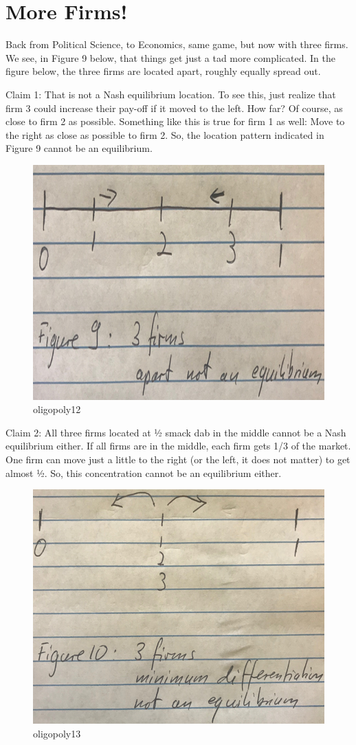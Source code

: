 \documentclass[
]{book}
\begin{document}
\hypertarget{more-firms}{%
\section{More Firms!}\label{more-firms}}

Back from Political Science, to Economics, same game, but now with three firms. We see, in Figure 9 below, that things get just a tad more complicated. In the figure below, the three firms are located apart, roughly equally spread out.

Claim 1: That is not a Nash equilibrium location. To see this, just realize that firm 3 could increase their pay-off if it moved to the left. How far? Of course, as close to firm 2 as possible. Something like this is true for firm 1 as well: Move to the right as close as possible to firm 2. So, the location pattern indicated in Figure 9 cannot be an equilibrium.

\begin{figure}

{\centering \includegraphics[width=0.5\linewidth]{img/oligopoly/fig12} 

}

\caption{oligopoly12}\label{fig:oligopoly12}
\end{figure}

Claim 2: All three firms located at ½ smack dab in the middle cannot be a Nash equilibrium either. If all firms are in the middle, each firm gets 1/3 of the market. One firm can move just a little to the right (or the left, it does not matter) to get almost ½. So, this concentration cannot be an equilibrium either.

\begin{figure}

{\centering \includegraphics[width=0.5\linewidth]{img/oligopoly/fig13} 

}

\caption{oligopoly13}\label{fig:oligopoly13}
\end{figure}
\end{document}
